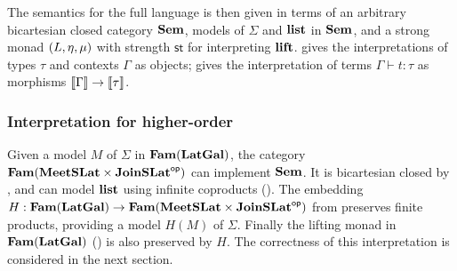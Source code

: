 The semantics for the full language is then given in terms of an arbitrary bicartesian closed category $\mathbf{Sem}$,
models of $\Sigma$ and $\mathbf{list}$ in $\mathbf{Sem}$, and a strong monad $(L, \eta, \mu)$ with strength
$\mathsf{st}$ for interpreting $\mathbf{lift}$.  gives the interpretations of types $\tau$
and contexts $\Gamma$ as objects;  gives the interpretation of terms $\Gamma \vdash t:
\tau$ as morphisms $\llbracket \Gamma \rrbracket \to \llbracket \tau \rrbracket$.

\subsubsection{Interpretation for higher-order \GPS}

Given a model $M$ of $\Sigma$ in $\mathbf{Fam}(\mathbf{LatGal})$, the category $\mathbf{Fam}(\mathbf{MeetSLat} \times \mathbf{JoinSLat}^{\mathsf{op}})$ can
implement $\mathbf{Sem}$. It is bicartesian closed by , and can model $\mathbf{list}$ using infinite
coproducts (). The embedding $H: \mathbf{Fam}(\mathbf{LatGal}) \to
\mathbf{Fam}(\mathbf{MeetSLat} \times \mathbf{JoinSLat}^{\mathsf{op}})$ from  preserves finite products, providing a model
$H(M)$ of $\Sigma$. Finally the lifting monad in $\mathbf{Fam}(\mathbf{LatGal})$ () is also
preserved by $H$. The correctness of this interpretation is considered in the next section.
